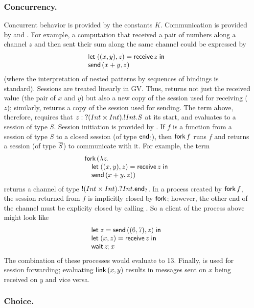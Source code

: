 \documentclass[orivec,envcountsame]{llncs}
\begin{document}
\subsubsection{Concurrency.}

Concurrent behavior is provided by the constants $K$.  Communication is provided by 
and .  For example, a computation that received a pair of numbers along a channel
$z$ and then sent their sum along the same channel could be expressed by
%
\[\bl
  \gvlet{((x, y), z)}{\gvreceive{z}}{} \\
  \gvsend{(x + y,z)}
\el\]
%
(where the interpretation of nested patterns by sequences of bindings is standard).  Sessions are
treated linearly in GV.  Thus,  returns not just the received value (the pair of
$x$ and $y$) but also a new copy of the session used for receiving ($z$); similarly, 
returns a copy of the session used for sending.  The term above, therefore, requires that $z :
{?(Int \times Int).{!Int.S}}$ at its start, and evaluates to a session of type $S$. Session
initiation is provided by .  If $f$ is a function from a session of type $S$ to a
closed session (of type $\mathsf{end}_!$), then $\mathsf{fork} \, f$ runs $f$ and returns a session (of
type $\overline{S}$) to communicate with it.  For example, the term
%
\[\bl
 \gvconst{fork} \app (\lambda z. \\
 \quad \bl
   \gvlet{((x, y), z)}{\gvreceive{z}}{} \\
   \gvsend{(x + y,z)}) \el
\el\]
%
returns a channel of type ${!(Int \times Int).{?Int.\mathsf{end}_?}}$.  In a process created by
$\mathsf{fork} \, f$, the session returned from $f$ is implicitly closed by $\mathsf{fork}$;
however, the other end of the channel must be explicity closed by calling .  So a
client of the process above might look like
%
\[\bl
  \gvlet{z}{\gvsend{((6,7),z)}}{} \\
  \gvlet{(x,z)}{\gvreceive{z}}{} \\
  \gvletunit{\gvconst{wait}\app z}{x}
\el\]
%
The combination of these processes would evaluate to 13.  Finally,  is used for
session forwarding; evaluating $\mathsf{link} \, (x, y)$ results in messages sent on $x$ being
received on $y$ and vice versa.

\subsubsection{Choice.}
\end{document}
